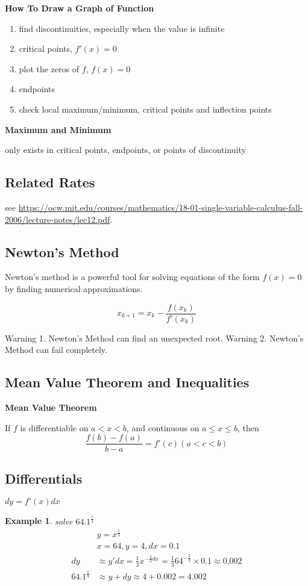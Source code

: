 \documentclass{article}
\newtheorem{exmp}{Example}
\begin{document}
\textbf{How To Draw a Graph of Function}
\begin{enumerate}
  \item find discontinuities, especially when the value is infinite
  \item critical points, $f'(x) = 0$
  \item plot the zeros of $f$, $f(x) = 0$
  \item endpoints
  \item check local maximum/minimum, critical points and inflection points
\end{enumerate}

\textbf{Maximum and Minimum}

only exists in critical points, endpoints, or points of discontinuity

\subsection{Related Rates}

see \url{https://ocw.mit.edu/courses/mathematics/18-01-single-variable-calculus-fall-2006/lecture-notes/lec12.pdf}.
\subsection{Newton's Method}

Newton's method is a powerful tool for solving equations of the form $f(x) = 0$ by finding numerical approximations.

$$x_{k+1} = x_k - \frac{f(x_k)}{f'(x_k)}$$

Warning 1. Newton's Method can find an unexpected root.
Warning 2. Newton's Method can fail completely.

\subsection{Mean Value Theorem and Inequalities}
\textbf{Mean Value Theorem}

If $f$ is differentiable on $a < x < b$, and continuous on $a \le x \le b$, then
$$\frac{f(b)-f(a)}{b-a} = f'(c) (a<c<b)$$

\subsection{Differentials}
$dy = f'(x)dx$
\begin{exmp}
  solve $64.1^{\frac{1}{3}}$
  \begin{align*}
    & y = x^{\frac{1}{3}} \\
    & x = 64, y = 4, dx = 0.1 \\
    dy &\approx y'dx = \frac{1}{3}x^{-\frac{2}{3}dx} = \frac{1}{3}64^{-\frac{2}{3}} \times 0.1 \approx 0.002 \\
    64.1^{\frac{1}{3}} &\approx y+dy \approx 4+0.002 = 4.002
  \end{align*}
\end{exmp}
\end{document}
